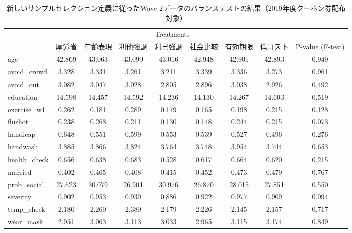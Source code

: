 \documentclass[
  11pt,
  a4paper,
]{article}
\begin{document}
\begin{table}

\caption{\label{tab:c1balancetestw2coupon1}新しいサンプルセレクション定義に従ったWave 2データのバランステストの結果（2019年度クーポン券配布対象）}
\centering
\fontsize{9}{11}\selectfont
\begin{tabular}[t]{lcccccccc}
\toprule
\multicolumn{1}{c}{ } & \multicolumn{7}{c}{Treatments} & \multicolumn{1}{c}{ } \\
\cmidrule(l{3pt}r{3pt}){2-8}
  & 厚労省 & 年齢表現 & 利他強調 & 利己強調 & 社会比較 & 有効期限 & 低コスト & P-value (F-test)\\
\midrule
age & 42.869 & 43.063 & 43.099 & 43.016 & 42.948 & 42.901 & 42.893 & 0.949\\
avoid\_crowd & 3.328 & 3.331 & 3.261 & 3.211 & 3.339 & 3.336 & 3.273 & 0.961\\
avoid\_out & 3.082 & 3.047 & 3.028 & 2.805 & 2.896 & 3.038 & 2.926 & 0.492\\
education & 14.598 & 14.457 & 14.592 & 14.236 & 14.130 & 14.267 & 14.603 & 0.519\\
exercise\_w1 & 0.262 & 0.181 & 0.289 & 0.179 & 0.165 & 0.198 & 0.215 & 0.128\\
flushot & 0.238 & 0.268 & 0.211 & 0.130 & 0.148 & 0.244 & 0.215 & 0.073\\
handicap & 0.648 & 0.551 & 0.599 & 0.553 & 0.539 & 0.527 & 0.496 & 0.276\\
handwash & 3.885 & 3.866 & 3.824 & 3.764 & 3.748 & 3.954 & 3.744 & 0.653\\
health\_check & 0.656 & 0.638 & 0.683 & 0.528 & 0.617 & 0.664 & 0.620 & 0.215\\
married & 0.402 & 0.465 & 0.408 & 0.415 & 0.452 & 0.473 & 0.479 & 0.767\\
prob\_social & 27.623 & 30.079 & 26.901 & 30.976 & 26.870 & 28.015 & 27.851 & 0.550\\
severity & 0.902 & 0.953 & 0.930 & 0.886 & 0.922 & 0.977 & 0.909 & 0.094\\
temp\_check & 2.180 & 2.260 & 2.380 & 2.179 & 2.226 & 2.145 & 2.157 & 0.717\\
wear\_mask & 2.951 & 3.063 & 3.113 & 3.033 & 2.965 & 3.115 & 3.174 & 0.849\\
\bottomrule
\end{tabular}
\end{table}
\end{document}
